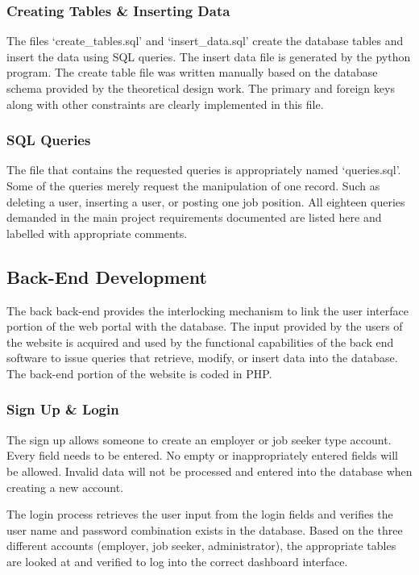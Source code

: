 \documentclass[11pt]{article}
\begin{document}
\subsubsection{Creating Tables \& Inserting Data}
The files `create\_tables.sql' and `insert\_data.sql' create the database tables and insert the data using SQL queries. The insert data file is generated by the python program. The create table file was written manually based on the database schema provided by the theoretical design work. The primary and foreign keys along with other constraints are clearly implemented in this file.


\subsubsection{SQL Queries}

The file that contains the requested queries is appropriately named `queries.sql'. Some of the queries merely request the manipulation of one record. Such as deleting a user, inserting a user, or posting one job position. All eighteen queries demanded in the main project requirements documented are listed here and labelled with appropriate comments.


\subsection{Back-End Development}

The back back-end provides the interlocking mechanism to link the user interface portion of the web portal with the database. The input provided by the users of the website is acquired and used by the functional capabilities of the back end software to issue queries that retrieve, modify, or insert data into the database. The back-end portion of the website is coded in PHP.

\subsubsection{Sign Up \& Login}

The sign up allows someone to create an employer or job seeker type account. Every field needs to be entered. No empty or inappropriately entered fields will be allowed. Invalid data will not be processed and entered into the database when creating a new account. \par
The login process retrieves the user input from the login fields and verifies the user name and password combination exists in the database. Based on the three different accounts (employer, job seeker, administrator), the appropriate tables are looked at and verified to log into the correct dashboard interface.
\end{document}
